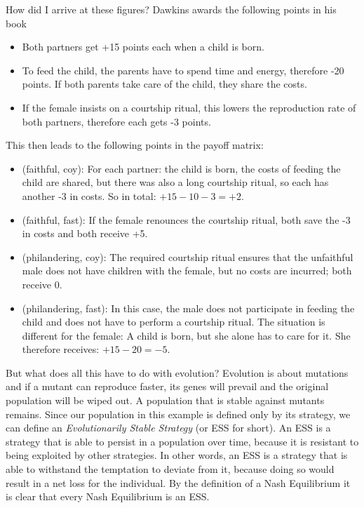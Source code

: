 \documentclass{article}
\begin{document}
	How did I arrive at these figures? Dawkins awards the following points in his book
	\begin{itemize}
		\item Both partners get +15 points each when a child is born.
		\item To feed the child, the parents have to spend time and energy, therefore -20 points. If both parents take care of the child, they share the costs.
		\item If the female insists on a courtship ritual, this lowers the reproduction rate of both partners, therefore each gets -3 points.
	\end{itemize}
	This then leads to the following points in the payoff matrix:
	\begin{itemize}
		\item (faithful, coy): For each partner: the child is born, the costs of feeding the child are shared, but there was also a long courtship ritual, so each has another -3 in costs. So in total: $+15 - 10 - 3 = +2$.
		\item (faithful, fast): If the female renounces the courtship ritual, both save the -3 in costs and both receive +5.
		\item (philandering, coy): The required courtship ritual ensures that the unfaithful male does not have children with the female, but no costs are incurred; both receive 0.
		\item (philandering, fast): In this case, the male does not participate in feeding the child and does not have to perform a courtship ritual. The situation is different for the female: A child is born, but she alone has to care for it. She therefore receives: $+15 - 20 = -5$.
	\end{itemize}

	But what does all this have to do with evolution? Evolution is about mutations and if a mutant can reproduce faster, its genes will prevail and the original population will be wiped out. A population that is stable against mutants remains. Since our population in this example is defined only by its strategy, we can define an \textit{Evolutionarily Stable Strategy} (or ESS for short). An ESS is a strategy that is able to persist in a population over time, because it is resistant to being exploited by other strategies. In other words, an ESS is a strategy that is able to withstand the temptation to deviate from it, because doing so would result in a net loss for the individual. By the definition of a Nash Equilibrium it is clear that every Nash Equilibrium is an ESS.
\end{document}
